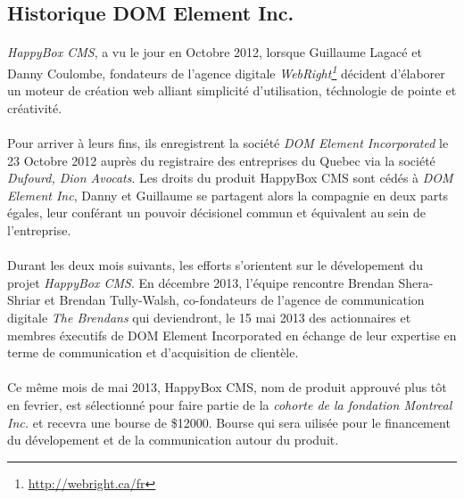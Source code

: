 \documentclass[11pt, a4paper ]{article}
\begin{document}
\begin{spacing}{1.5}
		\subsection{Historique DOM Element Inc.}

\paragraph{}
\emph{HappyBox CMS}, a vu le jour en Octobre 2012, lorsque Guillaume Lagacé et Danny Coulombe, fondateurs de l'agence digitale \emph{WebRight\footnote{\url{http://webright.ca/fr}}} décident d'élaborer un moteur de création web alliant simplicité d'utilisation, téchnologie de pointe et créativité.

\paragraph{}
Pour arriver à leurs fins, ils enregistrent la société \emph{DOM Element Incorporated} le 23 Octobre 2012 auprès du registraire des entreprises du Quebec via la société \emph{Dufourd, Dion Avocats}. Les droits du produit HappyBox CMS sont cédés à \emph{DOM Element Inc}, Danny et Guillaume se partagent alors la compagnie en deux parts égales, leur conférant un pouvoir décisionel commun et équivalent au sein de l'entreprise.

\paragraph{}
Durant les deux mois suivants, les efforts s'orientent sur le dévelopement du projet \emph{HappyBox CMS}.
En décembre 2013, l'équipe rencontre Brendan Shera-Shriar et Brendan Tully-Walsh, co-fondateurs de l'agence de communication digitale \emph{The Brendans} qui deviendront, le 15 mai 2013 des actionnaires et membres éxecutifs de DOM Element Incorporated en échange de leur expertise en terme de communication et d'acquisition de clientèle.


\paragraph{}
Ce même mois de mai 2013, HappyBox CMS, nom de produit approuvé plus tôt en fevrier, est sélectionné pour faire partie de la \emph{cohorte de la fondation Montreal Inc.} et recevra une bourse de \$12000. Bourse qui sera uilisée pour le financement du dévelopement et de la communication autour du produit.


\end{spacing}
\end{document}
